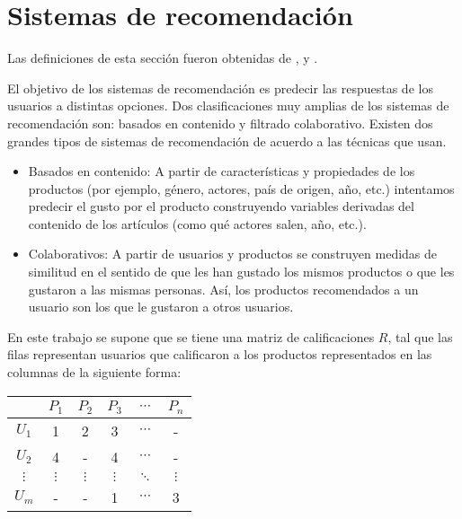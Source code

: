 \section{Sistemas de recomendación}

Las definiciones de esta sección fueron obtenidas de \cite{recommenderlab_manual}, \cite{koren2009matrix} y \cite{leskovec_mining_2014}.

El objetivo de los sistemas de recomendación es predecir las respuestas de los usuarios a distintas opciones. Dos clasificaciones muy amplias de los sistemas de recomendación son: basados en contenido y filtrado colaborativo. Existen dos grandes tipos de sistemas de recomendación de acuerdo a las técnicas que usan.

\begin{itemize}
\item Basados en contenido: A partir de características y propiedades de los productos (por ejemplo, género, actores, país de origen, año, etc.) intentamos predecir el gusto por el producto construyendo variables derivadas del contenido de los artículos (como qué actores salen, año, etc.).
\item Colaborativos: A partir de usuarios y productos se construyen medidas de similitud en el sentido de que les han gustado los mismos productos o que les gustaron a las mismas personas. Así, los productos recomendados a un usuario son los que le gustaron a otros usuarios.
\end{itemize}

En este trabajo se supone que se tiene una matriz de calificaciones $R$, tal que las filas representan usuarios que calificaron a los productos representados en las columnas de la siguiente forma:

\begin{center}
\begin{tabular}{ c | c  c c c c}
    & $P_1$ & $P_2$ & $P_3$ & $\cdots$ & $P_n$ \\
  \hline                       
  $U_1$ &   1 &     2 &     3 & $\cdots$ &      - \\
  $U_2$ &   4 &     - &     4 & $\cdots$  &     -\\
  $\vdots$ & $\vdots$ & $\vdots$ & $\vdots$ & $\ddots$ & $\vdots$\\
  $U_m$ &   - &     - &     1 & $\cdots$ &      3\\
  \hline  
\end{tabular}
\end{center}


